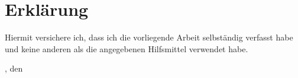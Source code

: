 \chapter*{Erklärung}

\parindent0pt

Hiermit versichere ich, dass ich die vorliegende Arbeit selbständig
verfasst habe und keine anderen als die angegebenen Hilfsmittel verwendet
habe.

\vspace*{9em}

\location, den \dateOfHandover \hfill \studentName
\parindent\oldparindent